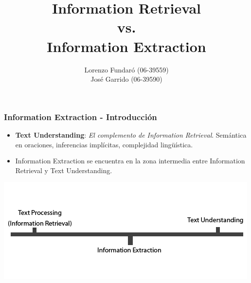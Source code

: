 \documentclass[xcolor=dvipsnames]{beamer}
\author{Lorenzo Fundaró (06-39559)\\ José Garrido (06-39590)}
\title{Information Retrieval \\vs. \\Information Extraction}
\institute{Universidad Simón Bolívar\\Inteligencia Artificial 2}
\begin{document}
\begin{frame}
\titlepage
\end{frame}


\begin{frame}
\frametitle{Information Extraction - Introducción}
\begin{itemize}
 \item \textbf{Text Understanding}: \emph{El complemento de Information Retrieval}. Semántica en oraciones, inferencias implícitas, complejidad lingüística.
 \item Information Extraction se encuentra en la zona intermedia entre Information Retrieval y Text Understanding.
\end{itemize}
\begin{center}
\includegraphics[scale=0.4]{IEandIR.png}
\end{center}
\end{frame}
\end{document}

